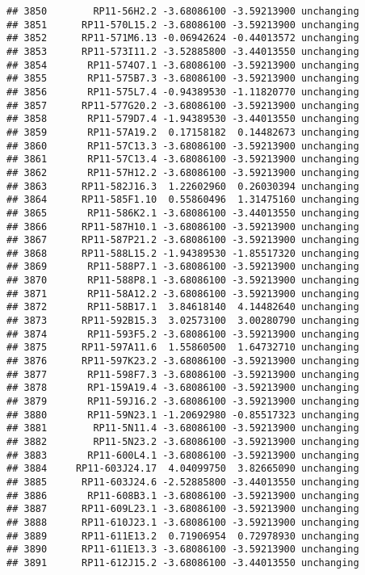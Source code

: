 \documentclass[]{article}
\begin{document}
\begin{verbatim}
## 3850        RP11-56H2.2 -3.68086100 -3.59213900 unchanging
## 3851      RP11-570L15.2 -3.68086100 -3.59213900 unchanging
## 3852      RP11-571M6.13 -0.06942624 -0.44013572 unchanging
## 3853      RP11-573I11.2 -3.52885800 -3.44013550 unchanging
## 3854       RP11-574O7.1 -3.68086100 -3.59213900 unchanging
## 3855       RP11-575B7.3 -3.68086100 -3.59213900 unchanging
## 3856       RP11-575L7.4 -0.94389530 -1.11820770 unchanging
## 3857      RP11-577G20.2 -3.68086100 -3.59213900 unchanging
## 3858       RP11-579D7.4 -1.94389530 -3.44013550 unchanging
## 3859       RP11-57A19.2  0.17158182  0.14482673 unchanging
## 3860       RP11-57C13.3 -3.68086100 -3.59213900 unchanging
## 3861       RP11-57C13.4 -3.68086100 -3.59213900 unchanging
## 3862       RP11-57H12.2 -3.68086100 -3.59213900 unchanging
## 3863      RP11-582J16.3  1.22602960  0.26030394 unchanging
## 3864      RP11-585F1.10  0.55860496  1.31475160 unchanging
## 3865       RP11-586K2.1 -3.68086100 -3.44013550 unchanging
## 3866      RP11-587H10.1 -3.68086100 -3.59213900 unchanging
## 3867      RP11-587P21.2 -3.68086100 -3.59213900 unchanging
## 3868      RP11-588L15.2 -1.94389530 -1.85517320 unchanging
## 3869       RP11-588P7.1 -3.68086100 -3.59213900 unchanging
## 3870       RP11-588P8.1 -3.68086100 -3.59213900 unchanging
## 3871       RP11-58A12.2 -3.68086100 -3.59213900 unchanging
## 3872       RP11-58B17.1  3.84618140  4.14482640 unchanging
## 3873      RP11-592B15.3  3.02573100  3.00280790 unchanging
## 3874       RP11-593F5.2 -3.68086100 -3.59213900 unchanging
## 3875      RP11-597A11.6  1.55860500  1.64732710 unchanging
## 3876      RP11-597K23.2 -3.68086100 -3.59213900 unchanging
## 3877       RP11-598F7.3 -3.68086100 -3.59213900 unchanging
## 3878       RP1-159A19.4 -3.68086100 -3.59213900 unchanging
## 3879       RP11-59J16.2 -3.68086100 -3.59213900 unchanging
## 3880       RP11-59N23.1 -1.20692980 -0.85517323 unchanging
## 3881        RP11-5N11.4 -3.68086100 -3.59213900 unchanging
## 3882        RP11-5N23.2 -3.68086100 -3.59213900 unchanging
## 3883       RP11-600L4.1 -3.68086100 -3.59213900 unchanging
## 3884     RP11-603J24.17  4.04099750  3.82665090 unchanging
## 3885      RP11-603J24.6 -2.52885800 -3.44013550 unchanging
## 3886       RP11-608B3.1 -3.68086100 -3.59213900 unchanging
## 3887      RP11-609L23.1 -3.68086100 -3.59213900 unchanging
## 3888      RP11-610J23.1 -3.68086100 -3.59213900 unchanging
## 3889      RP11-611E13.2  0.71906954  0.72978930 unchanging
## 3890      RP11-611E13.3 -3.68086100 -3.59213900 unchanging
## 3891      RP11-612J15.2 -3.68086100 -3.44013550 unchanging

\end{verbatim}
\end{document}
